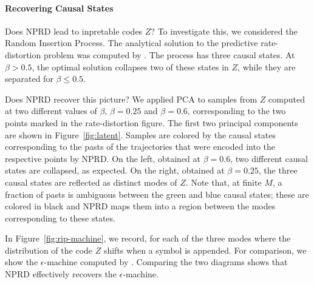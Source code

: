 \documentclass[11pt,letterpaper]{article}
\begin{document}
\paragraph{Recovering Causal States}
Does NPRD lead to inpretable codes $Z$?
To investigate this, we considered the Random Insertion Process. The analytical solution to the predictive rate-distortion problem was computed by \cite{marzen-predictive-2016}.
The process has three causal states.
At $\beta > 0.5$, the optimal solution collapses two of these states in $Z$, while they are separated for $\beta \leq 0.5$.

Does NPRD recover this picture?
We applied PCA to samples from $Z$ computed at two different values of $\beta$, $\beta = 0.25$ and $\beta = 0.6$, corresponding to the two points marked in the rate-distortion figure.
The first two principal components are shown in Figure~\ref{fig:latent}.
Samples are colored by the causal states corresponding to the pasts of the trajectories that were encoded into the respective points by NPRD.
On the left, obtained at $\beta=0.6$, two different causal states are collapsed, as expected.
On the right, obtained at $\beta=0.25$, the three causal states are reflected as distinct modes of $Z$.
Note that, at finite $M$, a fraction of pasts is ambiguous between the green and blue causal states; these are colored in black and NPRD maps them into a region between the modes corresponding to these states.

In Figure~\ref{fig:rip-machine}, we record, for each of the three modes where the distribution of the code $Z$ shifts when a symbol is appended.
For comparison, we show the $\epsilon$-machine computed by \cite{marzen-predictive-2016}.
Comparing the two diagrams shows that NPRD effectively recovers the $\epsilon$-machine. %
\end{document}
